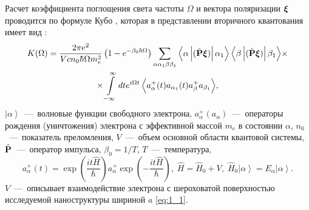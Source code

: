 Расчет коэффициента поглощения света частоты $\Omega$ и вектора поляризации $\boldsymbol{\mathbf{\xi}}$ проводится по формуле Кубо \cite{Kubo1957a}, которая в представлении вторичного квантования имеет вид \cite{Sinyavskii2010}:
\begin{multline} \label{eq:21_02}
K(\Omega) = \frac{2 \pi e^2}{V c n_0 \hbar \Omega m_e^2}\left( 1 - e^{-\beta_0 \hbar \Omega} \right) \sum_{\alpha \alpha_1 \beta \beta_1} {\left\langle \alpha \left| (\hat{\boldsymbol{\mathbf{P}}} \boldsymbol{\mathbf{\xi}})  \right| \alpha_1 \right\rangle \left\langle \beta \left| (\hat{\boldsymbol{\mathbf{P}}} \boldsymbol{\mathbf{\xi}})  \right| \beta_1 \right\rangle} \times\\
\times\int\limits_{-\infty }^{\infty} {dt e^{i\Omega t}\left\langle a_{\alpha }^+ (t) a_{\alpha_1 }(t) a_{\beta }^+ a_{\beta_1 } \right\rangle}  ,
\end{multline} 
${\left| \alpha  \right\rangle} $~---~волновые функции свободного электрона,   $a_{\alpha}^+ (a_{\alpha})$~---~операторы рождения (уничтожения) электрона с эффективной массой $m_e$ в состоянии $\alpha$,  $n_0$~---~показатель преломления, $V$~---~объем основной области квантовой системы,  $\hat{\boldsymbol{\mathbf{P}}}$~---~оператор импульса, $\beta_0 = 1 / T$,  $T$~---~температура,
\[
a_{\alpha }^+ (t)= \exp\left(\frac{it\hat{H}}{\hbar } \right)a_{\alpha }^+ \exp\left(-\frac{it\hat{H}}{\hbar } \right), \;
\hat{H} = \hat{H}_0 + V, \;
\hat{H}_0 {\left| \alpha  \right\rangle} = E_{\alpha} {\left| \alpha  \right\rangle}.
\]
$V$~---~описывает взаимодействие электрона с шероховатой поверхностью исследуемой наноструктуры шириной $a$ \eqref{eq:1_1}.

